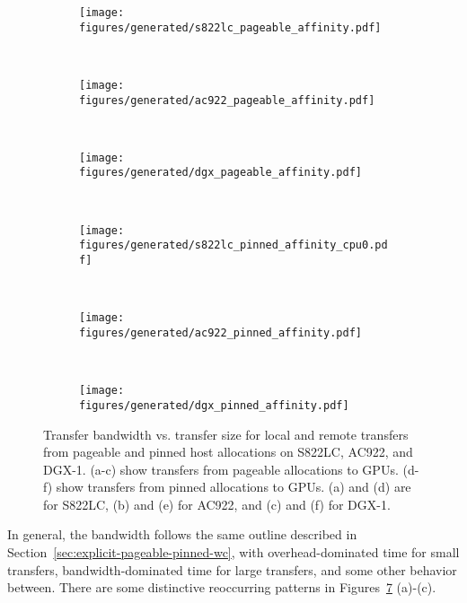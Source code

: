 \begin{figure}[ht]
	\centering
	\begin{subfigure}[b]{0.31\textwidth}
		\texttt{[image: figures/generated/s822lc\_pageable\_affinity.pdf]}
		\caption{}
		\label{fig:minsky_pageable_affinity}
	\end{subfigure}
	~
	\begin{subfigure}[b]{0.31\textwidth}
		\texttt{[image: figures/generated/ac922\_pageable\_affinity.pdf]}
		\caption{}
		\label{fig:hal_pageable_affinity}
	\end{subfigure}
	~
	\begin{subfigure}[b]{0.31\textwidth}
		\texttt{[image: figures/generated/dgx\_pageable\_affinity.pdf]}
		\caption{}
		\label{fig:dgx_pageable_affinity}
	\end{subfigure}
	\\
	\begin{subfigure}[b]{0.31\textwidth}
		\texttt{[image: figures/generated/s822lc\_pinned\_affinity\_cpu0.pdf]}
		\caption{}
		\label{fig:minsky_pinned_affinity}
	\end{subfigure}
	~
	\begin{subfigure}[b]{0.31\textwidth}
		\texttt{[image: figures/generated/ac922\_pinned\_affinity.pdf]}
		\caption{}
		\label{fig:hal_pinned_affinity}
	\end{subfigure}
	~
	\begin{subfigure}[b]{0.31\textwidth}
		\texttt{[image: figures/generated/dgx\_pinned\_affinity.pdf]}
		\caption{}
		\label{fig:dgx_pinned_affinity}
		
	\end{subfigure}
	\caption[CPU-GPU affinity and \texttt{cudaMemcpy} bandwidth]{
		Transfer bandwidth vs. transfer size for local and remote transfers from pageable and pinned host allocations on S822LC, AC922, and DGX-1.
		(a-c) show transfers from pageable allocations to GPUs.
		(d-f) show transfers from pinned allocations to GPUs.
		(a) and (d) are for S822LC, (b) and (e) for AC922, and (c) and (f) for DGX-1.
	}
	\label{fig:cpu-gpu-affinity-direction}
\end{figure}

In general, the bandwidth follows the same outline described in Section~\ref{sec:explicit-pageable-pinned-wc}, with overhead-dominated time for small transfers, bandwidth-dominated time for large transfers, and some other behavior between.
There are some distinctive reoccurring patterns in Figures~\ref{fig:cpu-gpu-affinity-direction} (a)-(c).

